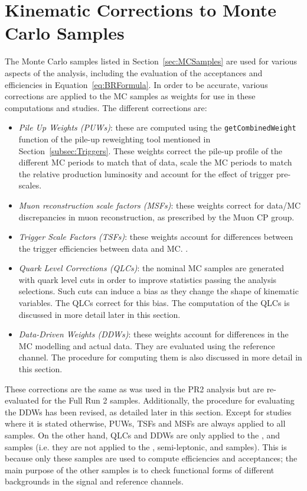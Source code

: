 \section{Kinematic Corrections to Monte Carlo Samples}
\label{sec:KinematicCorrections}

The Monte Carlo samples listed in Section~\ref{sec:MCSamples} are used for various aspects of the analysis, including the evaluation of the acceptances and efficiencies in Equation~\ref{eq:BRFormula}.
In order to be accurate, various corrections are applied to the MC samples as weights for use in these computations and studies. 
The different corrections are:
\begin{itemize}
    \item  \textit{Pile Up Weights (PUWs)}: these are computed using the \verb|getCombinedWeight| function of the pile-up reweighting tool\cite{Buttinger:2014726} mentioned in Section~\ref{subsec:Triggers}. These weights correct the pile-up profile of the different MC periods to match that of data, scale the MC periods to match the relative production luminosity and account for the effect of trigger pre-scales.   
    \item \textit{Muon reconstruction scale factors (MSFs)}: these weights correct for data/MC discrepancies in muon reconstruction, as prescribed by the Muon CP group. 
    \item \textit{Trigger Scale Factors (TSFs)}: these weights account for differences between the trigger efficiencies between data and MC. .
    \item \textit{Quark Level Corrections (QLCs)}: the nominal MC samples are generated with quark level cuts in order to improve statistics passing the analysis selections. Such cuts can induce a bias as they change the shape of kinematic variables. The QLCs correct for this bias. The computation of the QLCs is discussed in more detail later in this section. 
    \item \textit{Data-Driven Weights (DDWs)}: these weights account for differences in the MC modelling and actual data. They are evaluated using the \BpmKpmJpsi reference channel. The procedure for computing them is also discussed in more detail in this section.  
\end{itemize}

These corrections are the same as was used in the PR2 analysis but are re-evaluated for the Full Run 2 samples. 
Additionally, the procedure for evaluating the DDWs has been revised, as detailed later in this section.  
Except for studies where it is stated otherwise, PUWs, TSFs and MSFs are always applied to all samples.
On the other hand, QLCs and DDWs are only applied to the \Bmumu, \BpmKpmJpsi and \BsJpsiPhi samples (i.e. they are not applied to the \Bhh, semi-leptonic, \bbJpsiX and \bbmumuX samples).
This is because only these samples are used to compute efficiencies and acceptances; the main purpose of the other samples is to check functional forms of different backgrounds in the signal and reference channels. 

